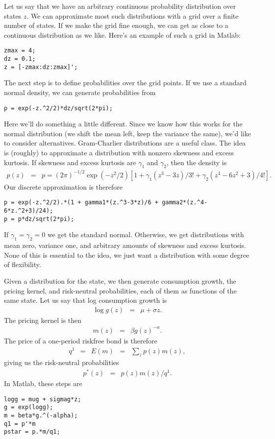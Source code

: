 \documentclass[11pt]{article}
\begin{document}
Let us say that we have an arbitrary continuous probability distribution over states $z$.
We can approximate most such distributions with a grid over a finite number
of states.
If we make the grid fine enough, we can get as close to a continuous distribution
as we like.
Here's an example of such a grid in Matlab:
\begin{verbatim}
zmax = 4;
dz = 0.1;
z = [-zmax:dz:zmax]';
\end{verbatim}
The next step is to define probabilities over the grid points.
If we use a standard normal density, we can generate probabilities from
\begin{verbatim}
p = exp(-z.^2/2)*dz/sqrt(2*pi);
\end{verbatim}
Here we'll do something a little different.
Since we know how this works for the normal distribution
(we shift the mean left, keep the variance the same),
we'd like to consider alternatives.
Gram-Charlier distributions are a useful class.
The idea is (roughly) to approximate a distribution
with nonzero skewness and excess kurtosis.
If skewness and excess kurtosis are $\gamma_1$ and $\gamma_2$,
then the density is
\begin{eqnarray*}
    p(z) &=& p = (2 \pi)^{-1/2} \exp(-z^2/2)[1 + \gamma_1(z^3-3z)/3! + \gamma_2(z^4-6z^2+3)/4!] .
\end{eqnarray*}
Our discrete approximation is therefore
\begin{verbatim}
p = exp(-z.^2/2).*(1 + gamma1*(z.^3-3*z)/6 + gamma2*(z.^4-6*z.^2+3)/24);
p = p*dz/sqrt(2*pi);
\end{verbatim}
If $\gamma_1 = \gamma_2 = 0$ we get the standard normal.
Otherwise, we get distributions with mean zero, variance one,
and arbitrary amounts of skewness and excess kurtosis.
None of this is essential to the idea, we just want a distribution with some
degree of flexibility.

Given a distribution for the state, we then generate consumption
growth, the pricing kernel, and risk-neutral probabilities,
each of them as functions of the same state.
Let us say that log consumption growth is
\begin{eqnarray*}
    \log g(z) &=& \mu + \sigma z .
\end{eqnarray*}
The pricing kernel is then
\begin{eqnarray*}
    m(z) &=& \beta g(z)^{-\alpha}  .
\end{eqnarray*}
The price of a one-period riskfree bond is therefore
\begin{eqnarray*}
    q^1 &=& E(m) \;\;=\;\; \sum_z p(z) m(z) ,
\end{eqnarray*}
giving us the risk-neutral probabilities
\begin{eqnarray*}
    p^*(z) &=& p(z) m(z) / q^1 .
\end{eqnarray*}
In Matlab, these steps are
\begin{verbatim}
logg = mug + sigmag*z;
g = exp(logg);
m = beta*g.^(-alpha);
q1 = p'*m
pstar = p.*m/q1;
\end{verbatim}
\end{document}
